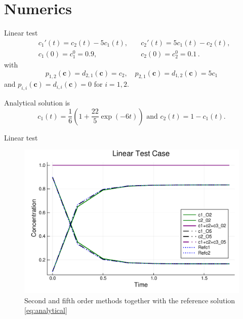\documentclass[aspectratio=169]{beamer}
\newcommand{\1}{\begin{pmatrix}
                 1\\
                 1
                \end{pmatrix}}
\def\bc{\mathbf{c}}
\begin{document}
\section{Numerics}
\begin{frame}{Linear test}
\begin{equation}\label{eq:linear_test}
\begin{aligned}
 &c_1'(t)=c_2(t)-5c_1(t),\quad  &c_2'(t)=5c_1(t)-c_2(t),\\
 &c_1(0)=c_1^0=0.9, \quad  &c_2(0)=c_2^0=0.1 \, .
\end{aligned}
\end{equation}
with
\begin{equation*}
  p_{1,2}(\bc)=d_{2,1}(\bc)=c_2, \quad p_{2,1}(\bc)=d_{1,2}(\bc)=5c_1 
\end{equation*}
and $p_{i,i}(\bc)=d_{i,i}(\bc)=0$ for $i=1,2$.

Analytical solution is
\begin{equation}\label{eq:analytical}
 c_1(t)=\frac{1}{6}\left(1 +  \frac{22}{5} \exp(-6t) \right) \text{ and } c_2(t)=1-c_1(t).
\end{equation}

\end{frame}

\begin{frame}{Linear test}
\begin{figure}[!htp]
\centering
    \includegraphics[height=0.7\textheight]{images/LinearOrder25.pdf}
  \caption{ Second and fifth order methods together with the reference solution \eqref{eq:analytical}
 }
  \label{fig:Linear_model}
\end{figure}

\end{frame}
\end{document}
